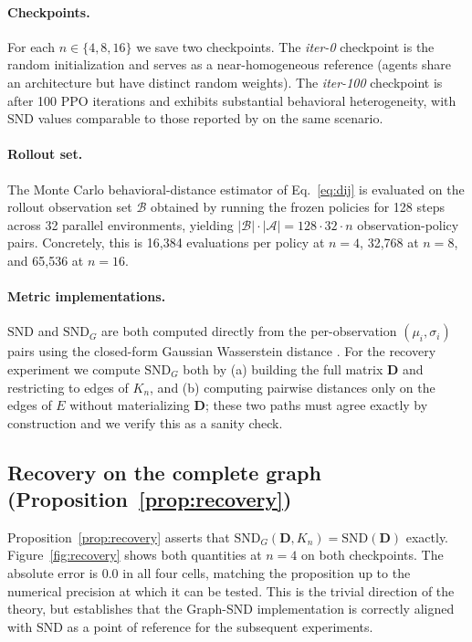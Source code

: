 \documentclass[11pt]{article}
\theoremstyle{plain}
\theoremstyle{definition}
\theoremstyle{remark}
\newcommand{\Agents}{\mathcal{A}}        %
\newcommand{\Rollouts}{\mathcal{B}}      %
\newcommand{\SND}{\ensuremath{\mathrm{SND}}}
\newcommand{\SNDG}{\mathrm{SND}_{G}}
\begin{document}
\paragraph{Checkpoints.} For each $n \in \{4, 8, 16\}$ we save two
checkpoints. The \emph{iter-0} checkpoint is the random initialization
and serves as a near-homogeneous reference (agents share an
architecture but have distinct random weights). The \emph{iter-100}
checkpoint is after 100 PPO iterations and exhibits substantial
behavioral heterogeneity, with $\SND$ values comparable to those
reported by \citet{bettini2025snd} on the same scenario.

\paragraph{Rollout set.} The Monte Carlo behavioral-distance estimator
of Eq.~\eqref{eq:dij} is evaluated on the rollout observation set
$\Rollouts$ obtained by running the frozen policies for 128 steps
across 32 parallel environments, yielding $|\Rollouts| \cdot |\Agents|
= 128 \cdot 32 \cdot n$ observation-policy pairs. Concretely, this is
16{,}384 evaluations per policy at $n=4$, 32{,}768 at $n=8$, and
65{,}536 at $n=16$.

\paragraph{Metric implementations.} $\SND$ and $\SNDG$ are both
computed directly from the per-observation $(\mu_i, \sigma_i)$ pairs
using the closed-form Gaussian Wasserstein distance
\citep[Definition~1]{bettini2025snd}. For the recovery experiment we
compute $\SNDG$ both by (a) building the full matrix $\mathbf{D}$ and
restricting to edges of $K_n$, and (b) computing pairwise distances
only on the edges of $E$ without materializing $\mathbf{D}$; these two
paths must agree exactly by construction and we verify this as a
sanity check.

\subsection{Recovery on the complete graph (Proposition~\ref{prop:recovery})}
\label{sec:experiments:recovery}

Proposition~\ref{prop:recovery} asserts that $\SNDG(\mathbf{D}, K_n) =
\SND(\mathbf{D})$ exactly. Figure~\ref{fig:recovery} shows both
quantities at $n=4$ on both checkpoints. The absolute error is $0.0$ in
all four cells, matching the proposition up to the numerical precision
at which it can be tested. This is the trivial direction of the
theory, but establishes that the Graph-SND implementation is
correctly aligned with $\SND$ as a point of reference for the
subsequent experiments.
\end{document}
